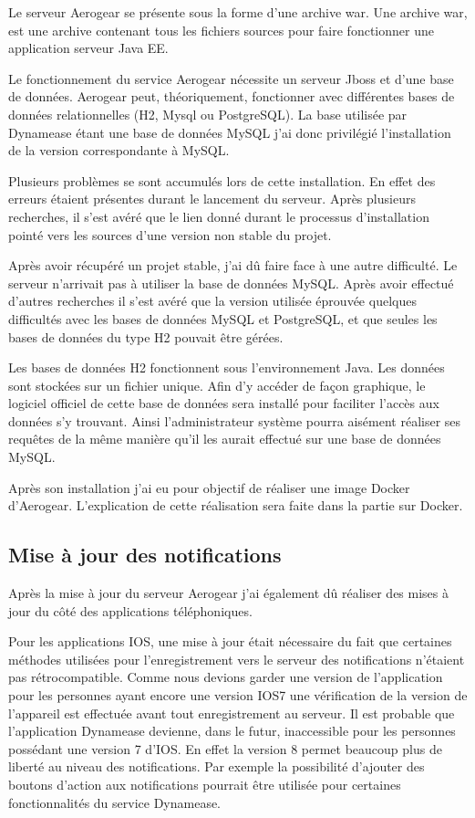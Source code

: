 Le serveur Aerogear se présente sous la forme d'une archive war. Une archive war, est une archive contenant tous les fichiers sources pour faire fonctionner une application serveur Java EE.

Le fonctionnement du service Aerogear nécessite un serveur Jboss et d'une base de données. Aerogear peut, théoriquement, fonctionner avec différentes bases de données relationnelles (H2, Mysql ou PostgreSQL). La base utilisée par Dynamease étant une base de données MySQL j'ai donc privilégié l'installation de la version correspondante à MySQL.

Plusieurs problèmes se sont accumulés lors de cette installation. En effet des erreurs étaient présentes durant le lancement du serveur. Après plusieurs recherches, il s'est avéré que le lien donné durant le processus d'installation pointé vers les sources d'une version non stable du projet. 

Après avoir récupéré un projet stable, j'ai dû faire face à une autre difficulté. Le serveur n'arrivait pas à utiliser la base de données MySQL. Après avoir effectué d'autres recherches il s'est avéré que la version utilisée éprouvée quelques difficultés avec les bases de données MySQL et PostgreSQL, et que seules les bases de données du type H2 pouvait être gérées.

Les bases de données H2 fonctionnent sous l'environnement Java. Les données sont stockées sur un fichier unique. Afin d'y accéder de façon graphique, le logiciel officiel de cette base de données sera installé pour faciliter l'accès aux données s'y trouvant. Ainsi l'administrateur système pourra aisément réaliser ses requêtes de la même manière qu'il les aurait effectué sur une base de données MySQL.

Après son installation j'ai eu pour objectif de réaliser une image Docker d'Aerogear. L'explication de cette réalisation sera faite dans la partie sur Docker.

\subsection{Mise à jour des notifications}

Après la mise à jour du serveur Aerogear j'ai également dû réaliser des mises à jour du côté des applications téléphoniques.

Pour les applications IOS, une mise à jour était nécessaire du fait que certaines méthodes utilisées pour l'enregistrement vers le serveur des notifications n'étaient pas rétrocompatible. Comme nous devions garder une version de l'application pour les personnes ayant encore une version IOS7 une vérification de la version de l'appareil est effectuée avant tout enregistrement au serveur. Il est probable que l'application Dynamease devienne, dans le futur, inaccessible pour les personnes possédant une version 7 d'IOS. En effet la version 8 permet beaucoup plus de liberté au niveau des notifications. Par exemple la possibilité d'ajouter des boutons d'action aux notifications pourrait être utilisée pour certaines fonctionnalités du service Dynamease.\\

